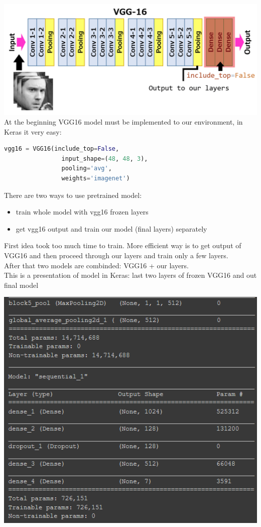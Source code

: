 \includegraphics[scale=0.5]{images/modelOne/vgg16layers.png}
At the beginning VGG16 model must be implemented to our environment, in Keras it very easy:
\begin{lstlisting}[language=Python]
    vgg16 = VGG16(include_top=False,
                input_shape=(48, 48, 3),
                pooling='avg',
                weights='imagenet')
\end{lstlisting}

There are two ways to use pretrained model:
\begin{itemize}
          \item train whole model with vgg16 frozen layers
          \item get vgg16 output and train our model (final layers) separately
\end{itemize}
First idea took too much time to train.
More efficient way is to get output of VGG16 and then proceed through our layers and train only a few layers.\\
After that two models are combinded: VGG16 + our layers.\\
This is a presentation of model in Keras: last two layers of frozen VGG16 and out final model\\
\begin{center}
\includegraphics[scale=0.75]{images/modelOne/modelKeras.png}
\end{center}

